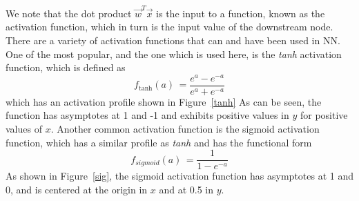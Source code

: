\documentclass[letterpaper,12pt]{article}
\newcommand{\figref}[1]{Figure~\ref{#1}}
\begin{document}
We note that the dot product $\vec{w}^T\vec{x}$ is the input to a function, known as the activation function, which in turn is the input value of the downstream node. There are a variety of activation functions that can and have been used in NN. One of the most popular, and the one which is used here, is the \textit{tanh} activation function, which is defined as
\begin{equation}
f_{\text{tanh}}(a) \, = \frac{e^a-e^{-a}}{e^a+e^{-a}}
\end{equation}
which has an activation profile shown in \figref{tanh} As can be seen, the function has asymptotes  at 1 and -1 and exhibits positive values in $y$ for positive values of $x$. Another common activation function is the sigmoid activation function, which has a similar profile as \textit{tanh} and has the functional form
\begin{equation}
f_{sigmoid}(a) \, = \frac{1}{1-e^{-a}}
\end{equation}
As shown in \figref{sig}, the sigmoid activation function has asymptotes at 1 and 0, and is centered at the origin in $x$ and at 0.5 in $y$. 
\end{document}
